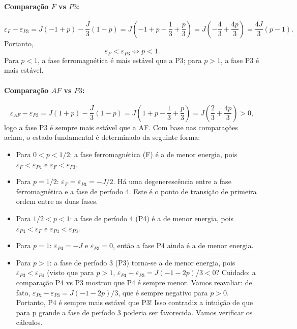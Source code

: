 \documentclass[11pt,a4paper]{article}
\begin{document}
\begin{itemize}
\paragraph{Comparação \(F\) vs \(P3\):}
\[
\varepsilon_F - \varepsilon_{P3} = J(-1+p) - \frac{J}{3}(1-p)
= J\left( -1 + p - \frac{1}{3} + \frac{p}{3} \right)
= J\left( -\frac{4}{3} + \frac{4p}{3} \right)
= \frac{4J}{3}(p - 1).
\]
%
Portanto,
%
\[
\varepsilon_F < \varepsilon_{P3} \iff p < 1.
\]
%
Para \(p < 1\), a fase ferromagnética é mais estável que a P3; para \(p > 1\), a fase P3 é mais estável.
%
\paragraph{Comparação \(AF\) vs \(P3\):}
%
\[
\varepsilon_{AF} - \varepsilon_{P3} = J(1+p) - \frac{J}{3}(1-p)
= J\left( 1 + p - \frac{1}{3} + \frac{p}{3} \right)
= J\left( \frac{2}{3} + \frac{4p}{3} \right) > 0,
\]
%
logo a fase P3 é sempre mais estável que a AF.
%
Com base nas comparações acima, o estado fundamental é determinado da seguinte forma:
%
\begin{itemize}
    \item Para \(0 < p < 1/2\): a fase ferromagnética (F) é a de menor energia, pois \(\varepsilon_F < \varepsilon_{P4}\) e \(\varepsilon_F < \varepsilon_{P3}\).
    \item Para \(p = 1/2\): \(\varepsilon_F = \varepsilon_{P4} = -J/2\). Há uma degenerescência entre a fase ferromagnética e a fase de período 4. Este é o ponto de transição de primeira ordem entre as duas fases.
    \item Para \(1/2 < p < 1\): a fase de período 4 (P4) é a de menor energia, pois \(\varepsilon_{P4} < \varepsilon_F\) e \(\varepsilon_{P4} < \varepsilon_{P3}\).
    \item Para \(p = 1\): \(\varepsilon_{P4} = -J\) e \(\varepsilon_{P3} = 0\), então a fase P4 ainda é a de menor energia.
    \item Para \(p > 1\): a fase de período 3 (P3) torna-se a de menor energia, pois \(\varepsilon_{P3} < \varepsilon_{P4}\) (visto que para \(p > 1\), \(\varepsilon_{P4} - \varepsilon_{P3} = J(-1 - 2p)/3 < 0\)? Cuidado: a comparação P4 vs P3 mostrou que P4 é sempre menor. Vamos reavaliar: de fato, \(\varepsilon_{P4} - \varepsilon_{P3} = J(-1 - 2p)/3\), que é sempre negativo para \(p>0\). Portanto, P4 é sempre mais estável que P3! Isso contradiz a intuição de que para p grande a fase de período 3 poderia ser favorecida. Vamos verificar os cálculos.


\end{itemize}
\end{itemize}
\end{document}
